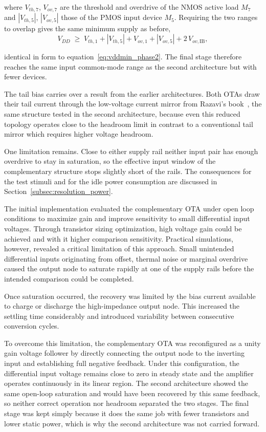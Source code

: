 \noindent
where $V_{th,7}$, $V_{ov,7}$ are the threshold and overdrive of the NMOS active load $M_7$ and $|V_{th,5}|$, $|V_{ov,5}|$ those of the PMOS input device $M_5$. Requiring the two ranges to overlap gives the same minimum supply as before,
\begin{equation}
    V_{DD} \;\geq\; V_{th,1} + |V_{th,5}| + V_{ov,1} + |V_{ov,5}| + 2\,V_{ov,\mathrm{IB}},
    \label{eq:vddmin_final}
\end{equation}

\noindent
identical in form to equation~\eqref{eq:vddmin_phase2}. The final stage therefore reaches the same input common-mode range as the second architecture but with fewer devices.

The tail bias carries over a result from the earlier architectures. Both OTAs draw their tail current through the low-voltage current mirror from Razavi's book~\cite{razavi}, the same structure tested in the second architecture, because even this reduced topology operates close to the headroom limit in contrast to a conventional tail mirror which requires higher voltage headroom.

One limitation remains. Close to either supply rail neither input pair has enough overdrive to stay in saturation, so the effective input window of the complementary structure stops slightly short of the rails. The consequences for the test stimuli and for the idle power consumption are discussed in Section~\ref{subsec:resolution_power}.

The initial implementation evaluated the complementary OTA under open loop conditions to maximize gain and improve sensitivity to small differential input voltages. Through transistor sizing optimization, high voltage gain could be achieved and with it higher comparison sensitivity. Practical simulations, however, revealed a critical limitation of this approach. Small unintended differential inputs originating from offset, thermal noise or marginal overdrive caused the output node to saturate rapidly at one of the supply rails before the intended comparison could be completed.

Once saturation occurred, the recovery was limited by the bias current available to charge or discharge the high-impedance output node. This increased the settling time considerably and introduced variability between consecutive conversion cycles.

To overcome this limitation, the complementary OTA was reconfigured as a unity gain voltage follower by directly connecting the output node to the inverting input and establishing full negative feedback. Under this configuration, the differential input voltage remains close to zero in steady state and the amplifier operates continuously in its linear region. The second architecture showed the same open-loop saturation and would have been recovered by this same feedback, so neither correct operation nor headroom separated the two stages. The final stage was kept simply because it does the same job with fewer transistors and lower static power, which is why the second architecture was not carried forward.

